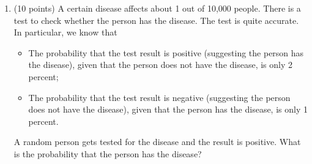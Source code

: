 \documentclass{article}%
\begin{document}
\begin{enumerate}
    \item (10 points) A  certain  disease  affects  about 1 out  of 10,000  people.  There  is  a  test  to  check whether the person has the disease. The test is quite accurate. In particular, we know that

    \begin{itemize}
        \item The probability that the test result is positive  (suggesting the person has the disease), given that the person does not have the disease, is only 2 percent; 
        \item The probability that the test result is negative (suggesting the person does not have the disease), given that the person has the disease, is only 1 percent. 
    \end{itemize}

    A random person gets tested for the disease and the result is positive. What is the probability that the person has the disease?
\end{enumerate}
\end{document}
